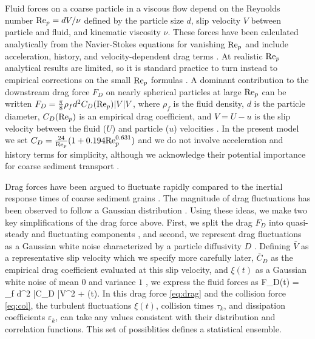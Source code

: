Fluid forces on a coarse particle in a viscous flow depend on the Reynolds number $\text{Re}_p = d V/\nu$ defined by the particle size $d$, slip velocity $V$ between particle and fluid, and kinematic viscosity $\nu$.
These forces have been calculated analytically from the Navier-Stokes equations for vanishing $\text{Re}_p$ and include acceleration, history, and velocity-dependent drag terms \citep{Hjelmfelt1966, Maxey1983, Auton1987}.
At realistic $\text{Re}_p$ analytical results are limited, so it is standard practice to turn instead to empirical corrections on the small $\text{Re}_p$ formulas \citep{Schmeeckle2007,Mei2006}.
A dominant contribution to the downstream drag force $F_D$ on nearly spherical particles at large $\text{Re}_p$ can be written $F_D = \frac{\pi}{8}
\rho_f d^2 C_D(\text{Re}_p) |V|V$, where $\rho_f$ is the fluid density, $d$ is the particle diameter, $C_D(\text{Re}_p)$ is an empirical drag coefficient, and $V = U-u$ is the slip velocity between the fluid ($U$) and particle ($u$) velocities \citep{Coleman1967, Schmeeckle2007, Dwivedi2012}.
In the present model we set $C_D = \frac{24}{\text{Re}_p}( 1 + 0.194 \text{Re}_p^{0.631})$ \citep{Clift1978,Gonzalez2017} and we do not involve acceleration and history terms for simplicity, although we acknowledge their potential importance for coarse sediment transport \citep{Michaelides1995,Armenio2001,Dalche2015}.

Drag forces have been argued to fluctuate rapidly compared to the inertial response times of coarse sediment grains \citep{Fan2014}.
The magnitude of drag fluctuations has been observed to follow a Gaussian distribution \citep{Hofland2006,Schmeeckle2007,Dwivedi2010,Celik2014}.
Using these ideas, we make two key simplifications of the drag force above.
First, we split the drag $F_D$ into quasi-steady and fluctuating components \citep{Michaelides1997}, and second, we represent drag fluctuations as a Gaussian white noise characterized by a particle diffusivity $D$ \citep{Fan2014,Ancey2014}. 
Defining $\bar{V}$ as a representative slip velocity which we specify more carefully later,  $\bar{C}_D$ as the empirical drag coefficient evaluated at this slip velocity, and $\xi(t)$ as a Gaussian white noise of mean $0$ and variance $1$ \citep{Gardiner1983}, we express the fluid forces as
\be F_D(t) = 
\rho_f d^2 \bar{C}_D \bar{V}^2 +  \eta(t). \ee
In this drag force \ref{eq:drag} and the collision force \ref{eq:col}, the turbulent fluctuations $\xi(t)$, collision times $\tau_k$, and dissipation coefficients $\varepsilon_k$, can take any values consistent with their distribution and correlation functions. This set of possiblities defines a statistical ensemble.

